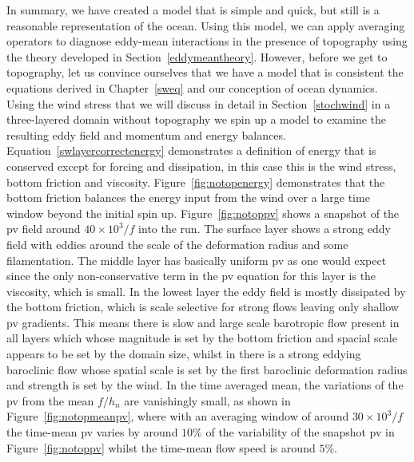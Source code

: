 \documentclass[12pt,a4paper]{report}
\newcommand*\figref[1]{Figure~\ref{#1}}
\newcommand*\equref[1]{Equation~\eqref{#1}}
\newcommand*\secref[1]{Section~\ref{#1}}
\begin{document}
  In summary, we have created a model that is simple and quick, but still is a
  reasonable representation of the ocean. Using this model, we can apply 
  averaging operators to diagnose eddy-mean interactions in the 
  presence of topography using the theory developed
  in \secref{eddymeantheory}. However, before we get to topography, let us convince
  ourselves that we have a model that is consistent the equations derived in
  Chapter~\ref{sweq} and our conception of ocean dynamics. 
  Using the wind stress that we will discuss in detail in \secref{stochwind} in
  a three-layered domain without topography we spin up a model to examine the 
  resulting eddy field and momentum and energy balances. 
  \equref{swlayercorrectenergy} demonstrates a definition of energy that is conserved 
  except for forcing and dissipation, in this case this is the wind stress, bottom 
  friction and viscosity. \figref{fig:notopenergy} demonstrates that 
  the bottom friction balances the energy input from the wind over a large time
  window beyond the initial spin up. \figref{fig:notoppv} shows a snapshot of the \gls{pv}
  field around $40 \times 10^{3}/f$ into the run. The surface layer shows a strong eddy
  field with eddies around the scale of the deformation radius and some filamentation.
  The middle layer has basically uniform \gls{pv} as one would expect since 
  the only non-conservative term in the \gls{pv} equation for this layer is the
  viscosity, which is small. In the lowest layer the eddy field is mostly dissipated
  by the bottom friction, which is scale selective for strong flows leaving only shallow
  \gls{pv} gradients. This means there is slow and large scale barotropic flow
  present in all layers which whose magnitude is set by the bottom friction and spacial
  scale appears to be set by the domain size, whilst in there is a strong eddying 
  baroclinic flow whose spatial scale is set by the first baroclinic deformation radius
  and strength is set by the wind. In the time averaged mean, the variations of the
   \gls{pv} from the mean $f/h_{n}$ are vanishingly small, as shown in \figref{fig:notopmeanpv}, where with an averaging window of around $30 \times 10^{3}/f$
   the time-mean \gls{pv} varies by around $10 \%$ of the variability of the snapshot 
   \gls{pv} in \figref{fig:notoppv} whilst the time-mean flow speed is around $5 \%$.
  
  
  
\end{document}
